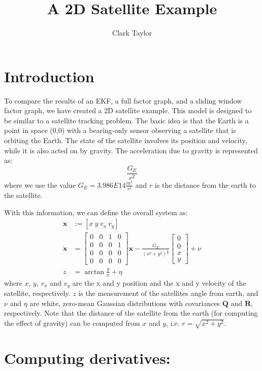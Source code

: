 \documentclass{article}
\title{A 2D Satellite Example}
\author{Clark Taylor}
\date{}
\newcommand{\mb}[1]{\mathbf{#1}}
\begin{document}
\section{Introduction}
To compare the results of an EKF, a full factor graph, and a sliding window factor graph, we have created a 2D satellite example.  This model is designed to be similar to a satellite tracking problem.  The basic idea is that the Earth is a point in space (0,0) with a bearing-only sensor observing a satellite that is orbiting the Earth.  The state of the satellite involves its position and velocity, while it is also acted on by gravity.  The acceleration due to gravity is represented as:
\begin{equation}
    \frac{G_E}{r^2}
\end{equation}
where we use the value $G_E=3.986E14\frac{m^3}{s^2}$ and $r$ is the distance from the earth to the satellite.

With this information, we can define the overall system as:
\begin{equation}
    \begin{split}
        \mb{x} &:= [x\ y\ v_x\ v_y]\\
        \dot{\mb{x}} &= \begin{bmatrix}
            0&0&1&0 \\ 0&0&0&1\\ 0&0&0&0\\ 0&0&0&0
        \end{bmatrix}\mb{x} - \frac{G_E}{(x^2+y^2)^\frac{3}{2}}\begin{bmatrix}0\\0\\x\\y\end{bmatrix}+\nu\\
        z &= \arctan\frac{y}{x}+\eta
    \end{split}
\end{equation}
where $x$, $y$, $v_x$ and $v_y$ are the x and y position  and the x and y velocity of the satellite, respectively.  $z$ is the measurement of the satellites angle from earth, and $\nu$ and $\eta$ are white, zero-mean Gaussian distributions with covariances $\mb{Q}$ and $\mb{R}$, respectively.  Note that the distance of the satellite from the earth (for computing the effect of gravity) can be computed from $x$ and $y$, i.e. $r = \sqrt{x^2+y^2}$.

\section{Computing derivatives:}
\end{document}
